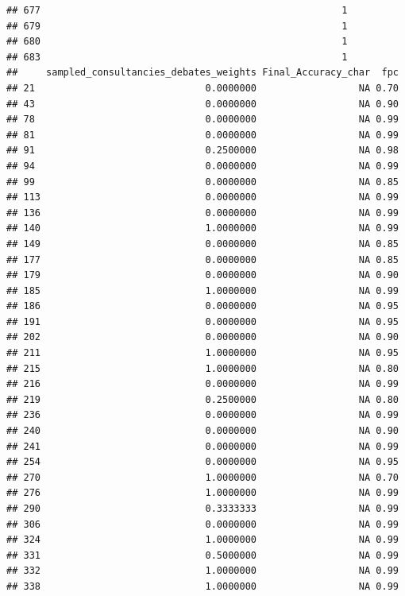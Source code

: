\documentclass[
]{article}
\begin{document}
\begin{verbatim}
## 677                                                     1
## 679                                                     1
## 680                                                     1
## 683                                                     1
##     sampled_consultancies_debates_weights Final_Accuracy_char  fpc
## 21                              0.0000000                  NA 0.70
## 43                              0.0000000                  NA 0.90
## 78                              0.0000000                  NA 0.99
## 81                              0.0000000                  NA 0.99
## 91                              0.2500000                  NA 0.98
## 94                              0.0000000                  NA 0.99
## 99                              0.0000000                  NA 0.85
## 113                             0.0000000                  NA 0.99
## 136                             0.0000000                  NA 0.99
## 140                             1.0000000                  NA 0.99
## 149                             0.0000000                  NA 0.85
## 177                             0.0000000                  NA 0.85
## 179                             0.0000000                  NA 0.90
## 185                             1.0000000                  NA 0.99
## 186                             0.0000000                  NA 0.95
## 191                             0.0000000                  NA 0.95
## 202                             0.0000000                  NA 0.90
## 211                             1.0000000                  NA 0.95
## 215                             1.0000000                  NA 0.80
## 216                             0.0000000                  NA 0.99
## 219                             0.2500000                  NA 0.80
## 236                             0.0000000                  NA 0.99
## 240                             0.0000000                  NA 0.90
## 241                             0.0000000                  NA 0.99
## 254                             0.0000000                  NA 0.95
## 270                             1.0000000                  NA 0.70
## 276                             1.0000000                  NA 0.99
## 290                             0.3333333                  NA 0.99
## 306                             0.0000000                  NA 0.99
## 324                             1.0000000                  NA 0.99
## 331                             0.5000000                  NA 0.99
## 332                             1.0000000                  NA 0.99
## 338                             1.0000000                  NA 0.99

\end{verbatim}
\end{document}
